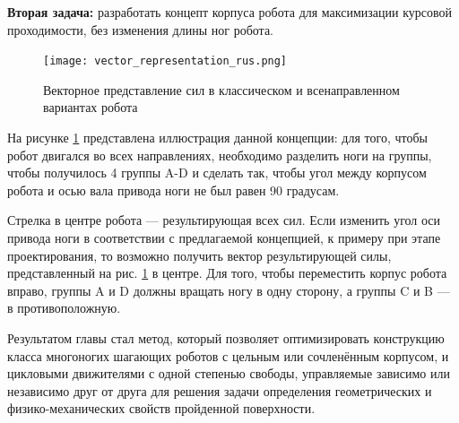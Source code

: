 
\textbf{Вторая задача:} разработать концепт корпуса робота для максимизации курсовой проходимости, без изменения длины ног робота.

\begin{figure}[h]
    \centering\texttt{[image: vector\_representation\_rus.png]}
    \caption{Векторное представление сил в классическом и всенаправленном вариантах робота}
    \label{fig:omnidirection}
\end{figure}

На рисунке \ref{fig:omnidirection} представлена иллюстрация данной концепции: для того, чтобы робот двигался во всех направлениях, необходимо разделить ноги на группы, чтобы получилось 4 группы A-D и сделать так, чтобы угол между корпусом робота и осью вала привода ноги не был равен 90 градусам. 

Стрелка в центре робота --- результирующая всех сил. Если изменить угол оси привода ноги в соответствии с предлагаемой концепцией, к примеру при этапе проектирования, то возможно получить вектор результирующей силы, представленный на рис. \ref{fig:omnidirection} в центре. Для того, чтобы переместить корпус робота вправо, группы A и D должны вращать ногу в одну сторону, а группы C и B --- в противоположную.


Результатом главы стал метод, который позволяет оптимизировать конструкцию класса многоногих шагающих роботов с цельным или сочленённым корпусом, и цикловыми движителями с одной степенью свободы, управляемые зависимо или независимо друг от друга для решения задачи определения геометрических и физико-механических свойств пройденной поверхности.

